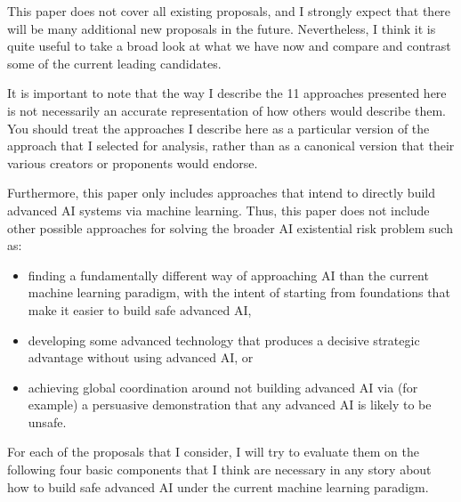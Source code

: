 \documentclass[
  onecolumn,
  natbib,
]{miri-tech-article}
\begin{document}
This paper does not cover all existing proposals, and I strongly expect that there will be many additional new proposals in the future. Nevertheless, I think it is quite useful to take a broad look at what we have now and compare and contrast some of the current leading candidates.

It is important to note that the way I describe the 11 approaches presented here is not necessarily an accurate representation of how others would describe them. You should treat the approaches I describe here as a particular version of the approach that I selected for analysis, rather than as a canonical version that their various creators or proponents would endorse.

Furthermore, this paper only includes approaches that intend to directly build advanced AI systems via machine learning. Thus, this paper does not include other possible approaches for solving the broader AI existential risk problem such as:
\begin{itemize}
\item finding a fundamentally different way of approaching AI than the current machine learning paradigm, with the intent of starting from foundations that make it easier to build safe advanced AI,
\item developing some advanced technology that produces a decisive strategic advantage\cite{superintelligence} without using advanced AI, or
\item achieving global coordination around not building advanced AI via (for example) a persuasive demonstration that any advanced AI is likely to be unsafe.
\end{itemize}
For each of the proposals that I consider, I will try to evaluate them on the following four basic components that I think are necessary in any story about how to build safe advanced AI under the current machine learning paradigm.
\end{document}
